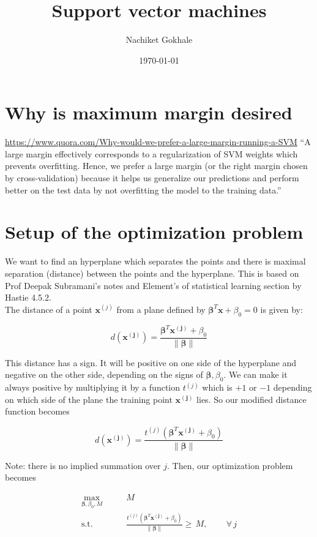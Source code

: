 \documentclass{article}
\newcommand{\beq}{\begin{equation}}
\newcommand{\eeq}{\end{equation}}
\begin{document}
\title{Support vector machines}
\author{Nachiket Gokhale}
\date{\today}
\maketitle
\section{Why is maximum margin desired}
\url{https://www.quora.com/Why-would-we-prefer-a-large-margin-running-a-SVM}
``A large margin effectively corresponds to a regularization of SVM weights which prevents overfitting. Hence, we prefer a large margin (or the right margin chosen by cross-validation) because it helps us generalize our predictions and perform better on the test data by not overfitting the model to the training data.''


\section{Setup of the optimization problem}
We want to find an hyperplane which separates the points and there is maximal separation (distance) between the points and the hyperplane. This is based on Prof Deepak Subramani's notes and Element's of statistical learning section by Hastie 4.5.2.\\

The distance of a point $\pmb{x}^{(j)}$ from a plane defined by $\pmb{\beta}^{T}\pmb{x} + \beta_0 = 0$ is given by:

\beq
d(\pmb{x^{(j)}}) = \frac{\pmb{\beta}^T\pmb{x^{(j)}} + \beta_0}{\|\pmb{\beta}\|}
\eeq

This distance has a sign. It will be positive on one side of the hyperplane and negative on the other side, depending on the signs of $\pmb{\beta},\beta_0$. We can make it always positive by multiplying it by a function $t^{(j)}$ which is $+1$ or $-1$ depending on which side of the plane the training point $\pmb{x^{(j)}}$ lies. So our modified distance function becomes

\beq
d(\pmb{x^{(j)}}) = \frac{t^{(j)}(\pmb{\beta}^T{\pmb{x^{(j)}}} + \beta_0)}{\|\pmb{\beta}\|}
\eeq

Note: there is no implied summation over $j$. Then, our optimization problem becomes

\beq
\label{eqn:formulation1}
\begin{aligned}
  \max_{\pmb{\beta},\beta_0,M} & \qquad M \\
  \textrm{s.t.} & \qquad \frac{t^{(j)}(\pmb{\beta}^T{\pmb{x^{(j)}}} + \beta_0)}{\|\pmb{\beta}\|} \ge\, M, \, \qquad \forall \,{j}
\end{aligned}
\eeq
\end{document}
